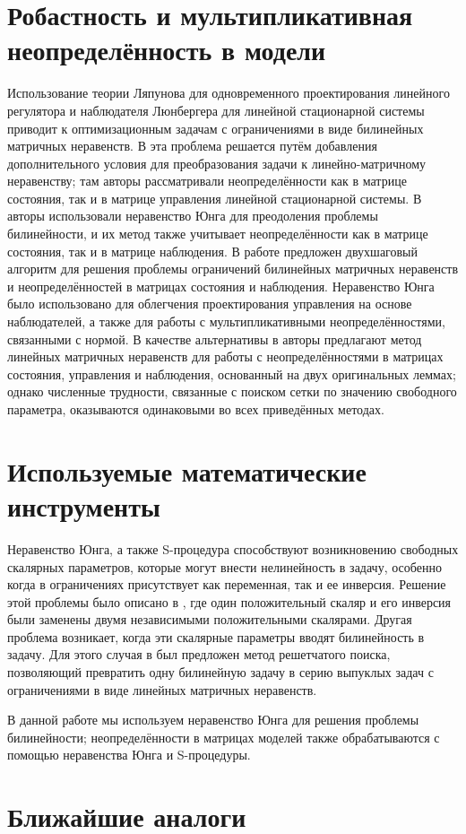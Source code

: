 \section{Робастность и мультипликативная неопределённость в модели}\label{sec:ch1/sec5}
Использование теории Ляпунова для одновременного проектирования линейного регулятора и наблюдателя Люнбергера для линейной стационарной системы приводит к оптимизационным задачам с ограничениями в виде билинейных матричных неравенств. В \cite{LIEN2004} эта проблема решается путём добавления дополнительного условия для преобразования задачи к линейно-матричному неравенству; там авторы рассматривали неопределённости как в матрице состояния, так и в матрице управления линейной стационарной системы. В \cite{KHELOUFI2013} авторы использовали неравенство Юнга для преодоления проблемы билинейности, и их метод также учитывает неопределённости как в матрице состояния, так и в матрице наблюдения. В работе \cite{ZEMOUCHE2015} предложен двухшаговый алгоритм для решения проблемы ограничений билинейных матричных неравенств и неопределённостей в матрицах состояния и наблюдения. Неравенство Юнга было использовано для облегчения проектирования управления на основе наблюдателей, а также для работы с мультипликативными неопределённостями, связанными с нормой. В качестве альтернативы в \cite{GRITLI2021} авторы предлагают метод линейных матричных неравенств для работы с неопределённостями в матрицах состояния, управления и наблюдения, основанный на двух оригинальных леммах; однако численные трудности, связанные с поиском сетки по значению свободного параметра, оказываются одинаковыми во всех приведённых методах.
 
\section{Используемые математические инструменты}\label{sec:ch1/sec6}
Неравенство Юнга, а также S-процедура \cite{Amato2011,LIEN2008} способствуют возникновению свободных скалярных параметров, которые могут внести нелинейность в задачу, особенно когда в ограничениях присутствует как переменная, так и ее инверсия. Решение этой проблемы было описано в \cite{KHELOUFI2016}, где один положительный скаляр и его инверсия были заменены двумя независимыми положительными скалярами. Другая проблема возникает, когда эти скалярные параметры вводят билинейность в задачу. Для этого случая в \cite{KHELOUFI2013} был предложен метод решетчатого поиска, позволяющий превратить одну билинейную задачу в серию выпуклых задач с ограничениями в виде линейных матричных неравенств.

В данной работе мы используем неравенство Юнга для решения проблемы билинейности; неопределённости в матрицах моделей также обрабатываются с помощью неравенства Юнга и S-процедуры.
\section{Ближайшие аналоги}\label{sec:ch1/sec7}
\FloatBarrier
